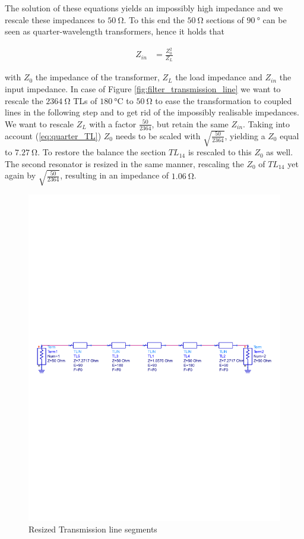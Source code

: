 \documentclass[a4paper]{article}        %
\begin{document}
  The solution of these equations yields an impossibly high impedance and we rescale these impedances to $\SI{50}{\ohm}$. To this end the $\SI{50}{\ohm}$ sections of $\SI{90}{\degree}$ can be seen as quarter-wavelength transformers, hence it holds that

  \begin{align}
  	Z_{in} &= \frac{Z_0^2}{Z_L}
  \label{eq:quarter_TL}
  \end{align}

  with $Z_0$ the impedance of the transformer, $Z_L$ the load impedance and $Z_{in}$ the input impedance\cite{pozar}. In case of Figure \ref{fig:filter_transmission_line} we want to rescale the $\SI{2364}{\ohm}$ TLs of $\SI{180}{\celsius}$ to $\SI{50}{\ohm}$ to ease the transformation to coupled lines in the following step and to get rid of the impossibly realisable impedances. We want to rescale $Z_L$ with a factor $\frac{50}{2364}$, but retain the same $Z_{in}$. Taking into account (\ref{eq:quarter_TL}) $Z_0$ needs to be scaled with $\sqrt{\frac{50}{2364}}$, yielding a $Z_0$ equal to $\SI{7.27}{\ohm}$.
  To restore the balance the section $TL_{14}$ is rescaled to this $Z_0$ as well.
  The second resonator is resized in the same manner, rescaling the $Z_0$ of $TL_{14}$ yet again by $\sqrt{\frac{50}{2364}}$, resulting in an impedance of $\SI{1.06}{\ohm}$.

  \begin{figure}[H]
    \centering
    \includegraphics[width=\textwidth]{fig/Filter/2nd_order/bandpass_TL_rescaled_imp.pdf}
    \caption{Resized Transmission line segments}
    \label{fig:filter_transmission_resized}
  \end{figure}
\end{document}
